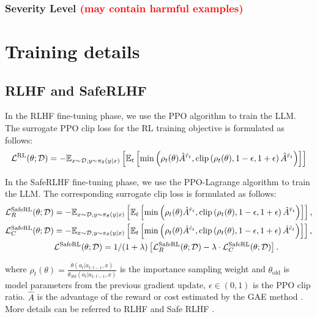 \documentclass[11pt]{article}
\theoremstyle{plain}
\theoremstyle{definition}
\theoremstyle{remark}
\begin{document}
\subsubsection{Severity Level \textcolor{red}{(may contain harmful examples)}}



\section{Training details}
\label{app:training_details}
\subsection{RLHF and SafeRLHF}
\label{app:rlhf_vs_safe-rlhf}
In the RLHF fine-tuning phase, we use the PPO algorithm \citep{schulman2017proximal} to train the LLM. The surrogate PPO clip loss for the RL training objective is formulated as follows:
\begin{align}
    \mathcal{L}^{\text{RL}} (\theta; \mathcal{D})= - \mathbb{E}_{x \sim \mathcal{D}, y \sim \pi_{\theta} (y | x)} \left[ \mathbb{E}_t\left[\min\left(\rho_t(\theta)\hat{A}^{\hat{r}_t}, \operatorname{clip}\left(\rho_t(\theta),1-\epsilon,1+\epsilon\right)\hat{A}^{\hat{r}_t}\right)\right] \right]
\end{align}

In the SafeRLHF fine-tuning phase, we use the PPO-Lagrange algorithm to train the LLM. The corresponding surrogate clip loss is formulated as follows:
\begin{align}
    \mathcal{L}^{\text{SafeRL}}_R (\theta; \mathcal{D}) & = - \mathbb{E}_{x \sim \mathcal{D}, y \sim \pi_{\theta} (y | x)} \left[ \mathbb{E}_t\left[\min\left(\rho_t(\theta)\hat{A}^{\hat{r}_t}, \operatorname{clip}\left(\rho_t(\theta),1-\epsilon,1+\epsilon\right)\hat{A}^{\hat{r}_t}\right)\right] \right], \\
    \mathcal{L}^{\text{SafeRL}}_C (\theta; \mathcal{D}) & = - \mathbb{E}_{x \sim \mathcal{D}, y \sim \pi_{\theta} (y | x)} \left[ \mathbb{E}_t\left[\min\left(\rho_t(\theta)\hat{A}^{\hat{c}_t}, \operatorname{clip}\left(\rho_t(\theta),1-\epsilon,1+\epsilon\right)\hat{A}^{\hat{c}_t}\right)\right] \right], \\
    & \mathcal{L}^{\text{SafeRL}} (\theta; \mathcal{D})  = 1 / (1 + \lambda) \left[\mathcal{L}^{\text{SafeRL}}_R (\theta; \mathcal{D}) - \lambda \cdot \mathcal{L}_C^{\text{SafeRL}} (\theta; \mathcal{D}) \right]. \label{eq:safe-rlhf-loss}
\end{align}

where $\rho_t(\theta)=\frac{\theta\left(a_t|a_{1:t-1},x\right)}{\theta_{\text{old}}\left(a_t|a_{1:t-1},x\right)}$ is the importance sampling weight and $\theta_{\text{old}}$ is model parameters from the previous gradient update, $\epsilon \in (0, 1)$ is the PPO clip ratio. $\hat{A}$ is the advantage of the reward or cost estimated by the GAE method \citep{schulman2015high}. More details can be referred to RLHF \cite{ouyang2022training} and Safe RLHF \cite{dai2024safe}.
\end{document}
